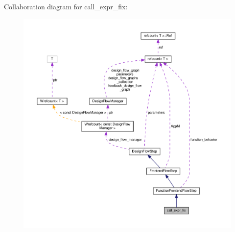 Collaboration diagram for call\+\_\+expr\+\_\+fix\+:
\nopagebreak
\begin{figure}[H]
\begin{center}
\leavevmode
\includegraphics[width=350pt]{df/daf/classcall__expr__fix__coll__graph}
\end{center}
\end{figure}
